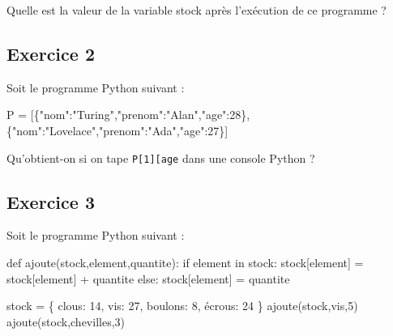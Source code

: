 \documentclass[
  letterpaper,
  DIV=11,
  numbers=noendperiod]{scrartcl}
\newenvironment{Shaded}{\begin{snugshade}}{\end{snugshade}}
\newcommand{\ControlFlowTok}[1]{\textcolor[rgb]{0.00,0.23,0.31}{#1}}
\newcommand{\DecValTok}[1]{\textcolor[rgb]{0.68,0.00,0.00}{#1}}
\newcommand{\KeywordTok}[1]{\textcolor[rgb]{0.00,0.23,0.31}{#1}}
\newcommand{\NormalTok}[1]{\textcolor[rgb]{0.00,0.23,0.31}{#1}}
\newcommand{\OperatorTok}[1]{\textcolor[rgb]{0.37,0.37,0.37}{#1}}
\newcommand{\StringTok}[1]{\textcolor[rgb]{0.13,0.47,0.30}{#1}}
\begin{document}
Quelle est la valeur de la variable stock après l'exécution de ce
programme ?

\hypertarget{fa-solid-pencil-alt-exercice-2}{%
\subsection{\texorpdfstring{ Exercice
2}{ Exercice 2}}\label{fa-solid-pencil-alt-exercice-2}}

Soit le programme Python suivant :

\begin{Shaded}
\begin{Highlighting}[]
\NormalTok{P }\OperatorTok{=}\NormalTok{ [\{}\StringTok{"nom"}\NormalTok{:}\StringTok{"Turing"}\NormalTok{,}\StringTok{"prenom"}\NormalTok{:}\StringTok{"Alan"}\NormalTok{,}\StringTok{"age"}\NormalTok{:}\DecValTok{28}\NormalTok{\},\{}\StringTok{"nom"}\NormalTok{:}\StringTok{"Lovelace"}\NormalTok{,}\StringTok{"prenom"}\NormalTok{:}\StringTok{"Ada"}\NormalTok{,}\StringTok{"age"}\NormalTok{:}\DecValTok{27}\NormalTok{\}]}
\end{Highlighting}
\end{Shaded}

Qu'obtient-on si on tape
\texttt{P{[}1{]}{[}\textquotesingle{}age\textquotesingle{}{]}} dans une
console Python ?

\hypertarget{fa-solid-pencil-alt-exercice-3}{%
\subsection{\texorpdfstring{ Exercice
3}{ Exercice 3}}\label{fa-solid-pencil-alt-exercice-3}}

Soit le programme Python suivant :

\begin{Shaded}
\begin{Highlighting}[]
\KeywordTok{def}\NormalTok{ ajoute(stock,element,quantite):}
  \ControlFlowTok{if}\NormalTok{ element }\KeywordTok{in}\NormalTok{ stock:}
\NormalTok{    stock[element] }\OperatorTok{=}\NormalTok{ stock[element] }\OperatorTok{+}\NormalTok{ quantite}
  \ControlFlowTok{else}\NormalTok{:}
\NormalTok{    stock[element] }\OperatorTok{=}\NormalTok{ quantite}

\NormalTok{stock }\OperatorTok{=}\NormalTok{ \{ }\StringTok{\textquotesingle{}clous\textquotesingle{}}\NormalTok{: }\DecValTok{14}\NormalTok{, }\StringTok{\textquotesingle{}vis\textquotesingle{}}\NormalTok{: }\DecValTok{27}\NormalTok{, }\StringTok{\textquotesingle{}boulons\textquotesingle{}}\NormalTok{: }\DecValTok{8}\NormalTok{, }\StringTok{\textquotesingle{}écrous\textquotesingle{}}\NormalTok{: }\DecValTok{24}\NormalTok{ \}}
\NormalTok{ajoute(stock,}\StringTok{\textquotesingle{}vis\textquotesingle{}}\NormalTok{,}\DecValTok{5}\NormalTok{)}
\NormalTok{ajoute(stock,}\StringTok{\textquotesingle{}chevilles\textquotesingle{}}\NormalTok{,}\DecValTok{3}\NormalTok{)}
\end{Highlighting}
\end{Shaded}
\end{document}
